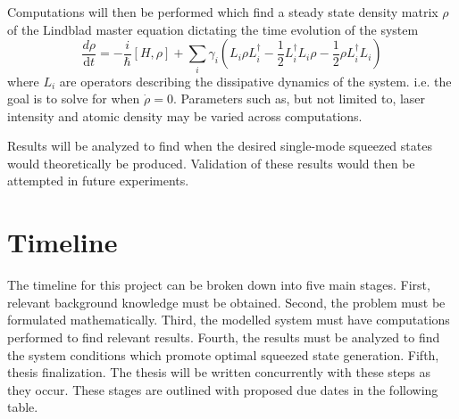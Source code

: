 \documentclass[aps,pra,showpacs,amsmath,amssymb,nofootinbib,longbibliography,superscriptaddress
]{revtex4-1}
\theoremstyle{definition}
\theoremstyle{remark}
\newcommand{\0}{\hat{0}}
\newcommand{\dt}{\mathrm{d}t}
\begin{document}
Computations will then be performed which find a steady state density matrix $\rho$ of the Lindblad master equation dictating the time evolution of the system
\begin{equation}
    \frac{d \rho}{\dt} = - \frac{i}{\hbar} [H, \rho] + \sum_i \gamma_i \left( L_i \rho L_i^{\dagger} - \frac{1}{2} L_i^{\dagger} L_i \rho - \frac{1}{2} \rho L_i^{\dagger} L_i \right)
\end{equation}
where $L_i$ are operators describing the dissipative dynamics of the system. i.e. the goal is to solve for when $\dot{\rho} = 0$. Parameters such as, but not limited to, laser intensity and atomic density may be varied across computations.

Results will be analyzed to find when the desired single-mode squeezed states would theoretically be produced. Validation of these results would then be attempted in future experiments.


\section{Timeline}

The timeline for this project can be broken down into five main stages. First, relevant background knowledge must be obtained. Second, the problem must be formulated mathematically. Third, the modelled system must have computations performed to find relevant results. Fourth, the results must be analyzed to find the system conditions which promote optimal squeezed state generation. Fifth, thesis finalization. The thesis will be written concurrently with these steps as they occur. These stages are outlined with proposed due dates in the following table.
\end{document}
